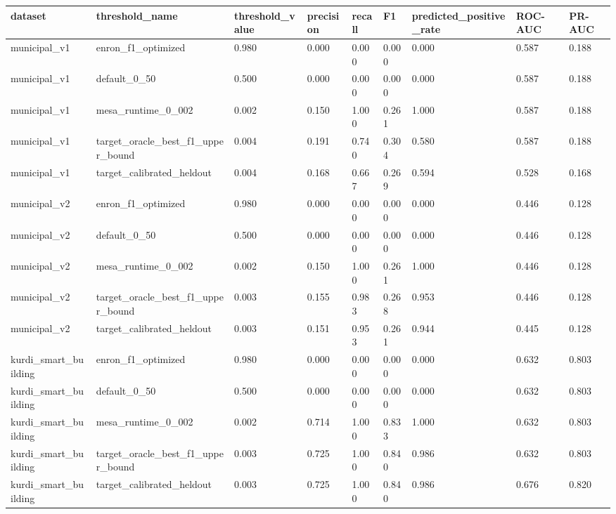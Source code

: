 \begin{tabular}{lllllllll}
\hline
dataset & threshold\_name & threshold\_value & precision & recall & F1 & predicted\_positive\_rate & ROC-AUC & PR-AUC \\
\hline
municipal\_v1 & enron\_f1\_optimized & 0.980 & 0.000 & 0.000 & 0.000 & 0.000 & 0.587 & 0.188 \\
municipal\_v1 & default\_0\_50 & 0.500 & 0.000 & 0.000 & 0.000 & 0.000 & 0.587 & 0.188 \\
municipal\_v1 & mesa\_runtime\_0\_002 & 0.002 & 0.150 & 1.000 & 0.261 & 1.000 & 0.587 & 0.188 \\
municipal\_v1 & target\_oracle\_best\_f1\_upper\_bound & 0.004 & 0.191 & 0.740 & 0.304 & 0.580 & 0.587 & 0.188 \\
municipal\_v1 & target\_calibrated\_heldout & 0.004 & 0.168 & 0.667 & 0.269 & 0.594 & 0.528 & 0.168 \\
municipal\_v2 & enron\_f1\_optimized & 0.980 & 0.000 & 0.000 & 0.000 & 0.000 & 0.446 & 0.128 \\
municipal\_v2 & default\_0\_50 & 0.500 & 0.000 & 0.000 & 0.000 & 0.000 & 0.446 & 0.128 \\
municipal\_v2 & mesa\_runtime\_0\_002 & 0.002 & 0.150 & 1.000 & 0.261 & 1.000 & 0.446 & 0.128 \\
municipal\_v2 & target\_oracle\_best\_f1\_upper\_bound & 0.003 & 0.155 & 0.983 & 0.268 & 0.953 & 0.446 & 0.128 \\
municipal\_v2 & target\_calibrated\_heldout & 0.003 & 0.151 & 0.953 & 0.261 & 0.944 & 0.445 & 0.128 \\
kurdi\_smart\_building & enron\_f1\_optimized & 0.980 & 0.000 & 0.000 & 0.000 & 0.000 & 0.632 & 0.803 \\
kurdi\_smart\_building & default\_0\_50 & 0.500 & 0.000 & 0.000 & 0.000 & 0.000 & 0.632 & 0.803 \\
kurdi\_smart\_building & mesa\_runtime\_0\_002 & 0.002 & 0.714 & 1.000 & 0.833 & 1.000 & 0.632 & 0.803 \\
kurdi\_smart\_building & target\_oracle\_best\_f1\_upper\_bound & 0.003 & 0.725 & 1.000 & 0.840 & 0.986 & 0.632 & 0.803 \\
kurdi\_smart\_building & target\_calibrated\_heldout & 0.003 & 0.725 & 1.000 & 0.840 & 0.986 & 0.676 & 0.820 \\
\hline
\end{tabular}



